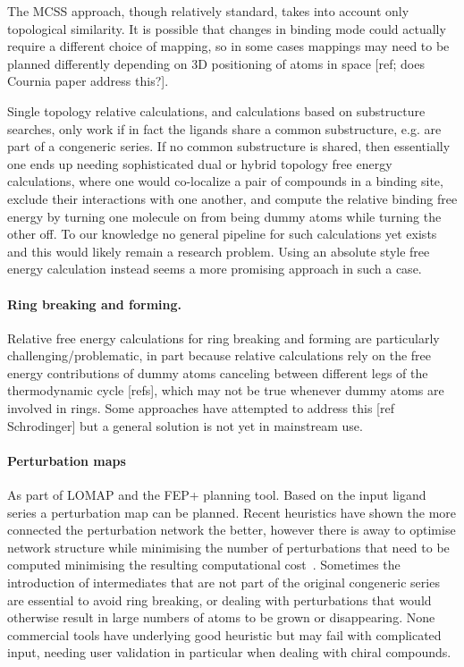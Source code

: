\documentclass[9pt,bestpractices]{livecoms}
\begin{document}
The MCSS approach, though relatively standard, takes into account only topological similarity.
It is possible that changes in binding mode could actually require a different choice of mapping, so in some cases mappings may need to be planned differently depending on 3D positioning of atoms in space [ref; does Cournia paper address this?].

Single topology relative calculations, and calculations based on substructure searches, only work if in fact the ligands share a common substructure, e.g. are part of a congeneric series.
If no common substructure is shared, then essentially one ends up needing sophisticated dual or hybrid topology free energy calculations, where one would co-localize a pair of compounds in a binding site, exclude their interactions with one another, and compute the relative binding free energy by turning one molecule on from being dummy atoms while turning the other off.
To our knowledge no general pipeline for such calculations yet exists and this would likely remain a research problem. Using an absolute style free energy calculation instead seems a more promising approach in such a case. 

\paragraph{Ring breaking and forming.} Relative free energy calculations for ring breaking and forming are particularly challenging/problematic, in part because relative calculations rely on the free energy contributions of dummy atoms canceling between different legs of the thermodynamic cycle [refs], which may not be true whenever dummy atoms are involved in rings.
Some approaches have attempted to address this [ref Schrodinger] but a general solution is not yet in mainstream use.

\paragraph{Perturbation maps}
As part of LOMAP and the FEP+ planning tool. Based on the input ligand series a perturbation map can be planned. Recent heuristics have shown the more connected the perturbation network the better, however there is away to optimise network structure while minimising the number of perturbations that need to be computed minimising the resulting computational cost~\cite{Mobely2019}. Sometimes the introduction of intermediates that are not part of the original congeneric series are essential to avoid ring breaking, or dealing with perturbations that would otherwise result in large numbers of atoms to be grown or disappearing. None commercial tools have underlying good heuristic but may fail with complicated input, needing user validation in particular when dealing with chiral compounds. 
\end{document}
